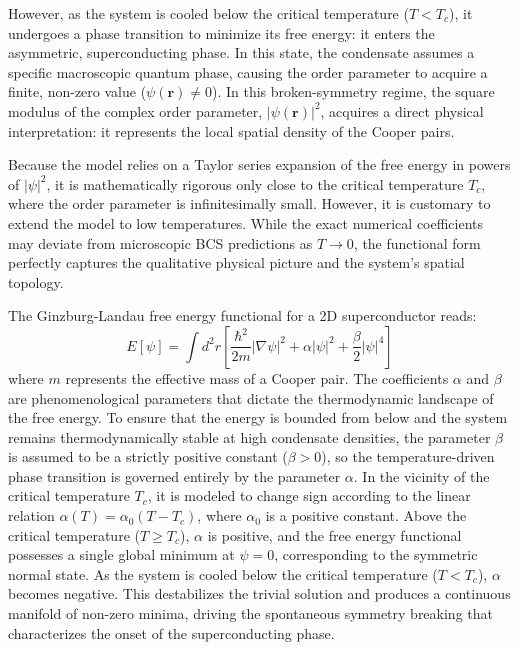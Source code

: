 \documentclass[english,binding=0.6cm,noexaminfo]{sapthesis}
\begin{document}
However, as the system is cooled below the critical temperature ($T < T_c$), it undergoes a phase transition to minimize its free energy: it enters the asymmetric, superconducting phase. In this state, the condensate assumes a specific macroscopic quantum phase, causing the order parameter to acquire a finite, non-zero value ($\psi(\mathbf{r}) \neq 0$). In this broken-symmetry regime, the square modulus of the complex order parameter, $|\psi(\mathbf{r})|^2$, acquires a direct physical interpretation: it represents the local spatial density of the Cooper pairs.

Because the model relies on a Taylor series expansion of the free energy in powers of $|\psi|^2$, it is mathematically rigorous only close to the critical temperature $T_c$, where the order parameter is infinitesimally small. However, it is customary to extend the model to low temperatures. While the exact numerical coefficients may deviate from microscopic BCS predictions as $T \to 0$, the functional form perfectly captures the qualitative physical picture and the system's spatial topology.

The Ginzburg-Landau free energy functional for a 2D superconductor reads:
\begin{equation}
    E[\psi] = \int d^2r \left[ \frac{\hbar^2}{2m}|\nabla\psi|^2 + \alpha|\psi|^2 + \frac{\beta}{2}|\psi|^4 \right]
\end{equation}
where $m$ represents the effective mass of a Cooper pair. The coefficients $\alpha$ and $\beta$ are phenomenological parameters that dictate the thermodynamic landscape of the free energy. To ensure that the energy is bounded from below and the system remains thermodynamically stable at high condensate densities, the parameter $\beta$ is assumed to be a strictly positive constant ($\beta > 0$), so the temperature-driven phase transition is governed entirely by the parameter $\alpha$. In the vicinity of the critical temperature $T_c$, it is modeled to change sign according to the linear relation $\alpha(T) = \alpha_0 (T - T_c)$, where $\alpha_0$ is a positive constant. Above the critical temperature ($T \ge T_c$), $\alpha$ is positive, and the free energy functional possesses a single global minimum at $\psi = 0$, corresponding to the symmetric normal state. As the system is cooled below the critical temperature ($T < T_c$), $\alpha$ becomes negative. This destabilizes the trivial solution and produces a continuous manifold of non-zero minima, driving the spontaneous symmetry breaking that characterizes the onset of the superconducting phase. 
\end{document}
